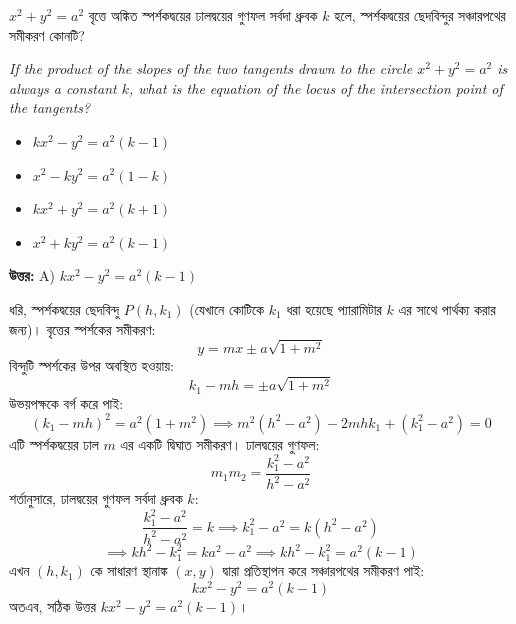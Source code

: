 \documentclass[12pt, a4paper]{article}
\begin{document}
\begin{tcolorbox}[questionbox={প্রশ্ন (Question) 35}]
    \noindent
    $x^2 + y^2 = a^2$ বৃত্তে অঙ্কিত স্পর্শকদ্বয়ের ঢালদ্বয়ের গুণফল সর্বদা ধ্রুবক $k$ হলে, স্পর্শকদ্বয়ের ছেদবিন্দুর সঞ্চারপথের সমীকরণ কোনটি?
    
    \vspace{0.8em}
    \begin{english}
    \noindent\textit{\color{darkgray}
    If the product of the slopes of the two tangents drawn to the circle $x^2 + y^2 = a^2$ is always a constant $k$, what is the equation of the locus of the intersection point of the tangents?
    }
    \end{english}
\end{tcolorbox}

\begin{itemize}[label={}, leftmargin=1cm, itemsep=0.5em]
    \item[\textbf{A)}] $kx^2 - y^2 = a^2(k - 1)$
    \item[\textbf{B)}] $x^2 - ky^2 = a^2(1 - k)$
    \item[\textbf{C)}] $kx^2 + y^2 = a^2(k + 1)$
    \item[\textbf{D)}] $x^2 + ky^2 = a^2(k - 1)$
\end{itemize}

\vspace{0.5em}
\begin{tcolorbox}[answerbox]
    \textbf{\color{success} উত্তর:} A) $kx^2 - y^2 = a^2(k - 1)$
\end{tcolorbox}
\vspace{1em}

\begin{tcolorbox}[solutionbox={সমাধান (Solution)}]
    \noindent
    ধরি, স্পর্শকদ্বয়ের ছেদবিন্দু $P(h, k_1)$ (যেখানে কোটিকে $k_1$ ধরা হয়েছে প্যারামিটার $k$ এর সাথে পার্থক্য করার জন্য)। বৃত্তের স্পর্শকের সমীকরণ:
    \[ y = mx \pm a\sqrt{1 + m^2} \]
    বিন্দুটি স্পর্শকের উপর অবস্থিত হওয়ায়:
    \[ k_1 - mh = \pm a\sqrt{1 + m^2} \]
    উভয়পক্ষকে বর্গ করে পাই:
    \[ (k_1 - mh)^2 = a^2(1 + m^2) \implies m^2(h^2 - a^2) - 2mhk_1 + (k_1^2 - a^2) = 0 \]
    এটি স্পর্শকদ্বয়ের ঢাল $m$ এর একটি দ্বিঘাত সমীকরণ। ঢালদ্বয়ের গুণফল:
    \[ m_1 m_2 = \frac{k_1^2 - a^2}{h^2 - a^2} \]
    শর্তানুসারে, ঢালদ্বয়ের গুণফল সর্বদা ধ্রুবক $k$:
    \[ \frac{k_1^2 - a^2}{h^2 - a^2} = k \implies k_1^2 - a^2 = k(h^2 - a^2) \]
    \[ \implies kh^2 - k_1^2 = ka^2 - a^2 \implies kh^2 - k_1^2 = a^2(k - 1) \]
    এখন $(h, k_1)$ কে সাধারণ স্থানাঙ্ক $(x, y)$ দ্বারা প্রতিস্থাপন করে সঞ্চারপথের সমীকরণ পাই:
    \[ kx^2 - y^2 = a^2(k - 1) \]
    অতএব, সঠিক উত্তর $kx^2 - y^2 = a^2(k - 1)$।
\end{tcolorbox}
\end{document}

